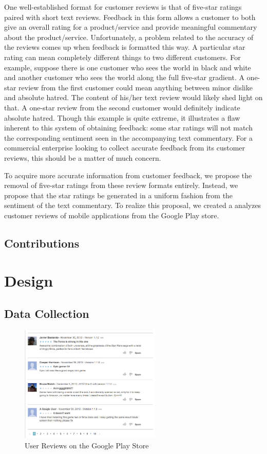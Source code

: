 \documentclass[11pt]{report} %
\begin{document}
One well-established format for customer reviews is that of five-star ratings paired with short text reviews. Feedback in this form allows a customer to both give an overall rating for a product/service and provide meaningful commentary about the product/service. Unfortunately, a problem related to the accuracy of the reviews comes up when feedback is formatted this way. A particular star rating can mean completely different things to two different customers. For example, suppose there is one customer who sees the world in black and white and another customer who sees the world along the full five-star gradient. A one-star review from the first customer could mean anything between minor dislike and absolute hatred. The content of his/her text review would likely shed light on that. A one-star review from the second customer would definitely indicate absolute hatred. Though this example is quite extreme, it illustrates a flaw inherent to this system of obtaining feedback: some star ratings will not match the corresponding sentiment seen in the accompanying text commentary. For a commercial enterprise looking to collect accurate feedback from its customer reviews, this should be a matter of much concern.

To acquire more accurate information from customer feedback, we propose the removal of five-star ratings from these review formats entirely. Instead, we propose that the star ratings be generated in a uniform fashion from the sentiment of the text commentary. To  realize this proposal, we created a analyzes customer reviews of mobile applications from the Google Play store.

\section{Contributions}

\chapter{Design}
\section{Data Collection}

\begin{figure}[h!]
  \centering
    \includegraphics[width=0.6\textwidth]{figures/playstore.png}
 \caption{User Reviews on the Google Play Store}
\label{fig:playstore}
\end{figure}
\end{document}

